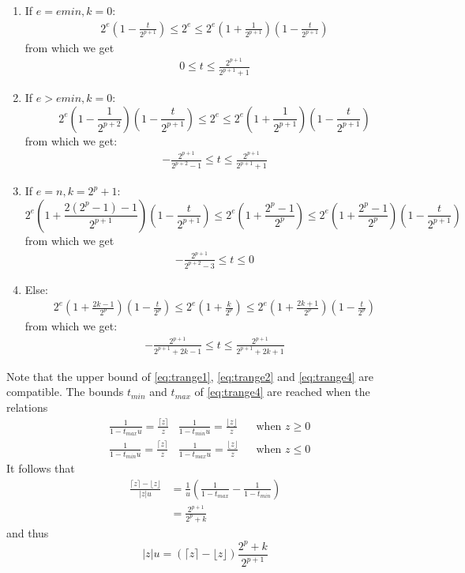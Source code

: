 \documentclass[10pt,a4paper]{article}
\theoremstyle{plain}
\theoremstyle{definition}
\newcommand{\ceil}[1]{\lceil #1 \rceil}
\newcommand{\floor}[1]{\lfloor #1 \rfloor}
\newcommand{\absv}[1]{\vert #1\vert}
\begin{document}
\begin{enumerate}
\item If $e=emin, k=0$:
\begin{align*}
2^e\left(1-\frac{t}{2^{p+1}}\right)\leq 2^e\leq 2^e\left(1+\frac{1}{2^{p+1}}\right)\left(1-\frac{t}{2^{p+1}}\right)
\end{align*}
from which we get
\begin{align}
0\leq t\leq\frac{2^{p+1}}{2^{p+1}+1}\label{eq:trange1}
\end{align}
\item If $e>emin, k=0$:
\[
2^e\left(1-\frac{1}{2^{p+2}}\right)\left(1-\frac{t}{2^{p+1}}\right)\leq 2^e\leq 2^e\left(1+\frac{1}{2^{p+1}}\right)\left(1-\frac{t}{2^{p+1}}\right)
\]
from which we get:
\begin{align}
-\frac{2^{p+1}}{2^{p+2}-1}\leq t\leq \frac{2^{p+1}}{2^{p+1}+1}\label{eq:trange2}
\end{align}
\item If $e=n, k=2^p+1$:
\[
2^e\left(1+\frac{2(2^p-1)-1}{2^{p+1}}\right)\left(1-\frac{t}{2^{p+1}}\right)\leq 2^e\left(1+\frac{2^p-1}{2^p}\right) \leq 2^e\left(1+\frac{2^p-1}{2^p}\right)\left(1-\frac{t}{2^{p+1}}\right)
\]
from which we get
\begin{align}
-\frac{2^{p+1}}{2^{p+2}-3}\leq t\leq 0\label{eq:trange3}
\end{align}

\item Else: 
\begin{align*}
2^e\left(1+\frac{2k-1}{2^p}\right)\left(1-\frac{t}{2^p}\right)\leq 2^e\left(1+\frac{k}{2^p}\right)\leq 2^e\left(1+\frac{2k+1}{2^p}\right)\left(1-\frac{t}{2^p}\right)
\end{align*}
from which we get:
\begin{align}
-\frac{2^{p+1}}{2^{p+1}+2k-1}\leq t\leq \frac{2^{p+1}}{2^{p+1}+2k+1}\label{eq:trange4}
\end{align}
\end{enumerate}


Note that the upper bound of \eqref{eq:trange1}, \eqref{eq:trange2} and \eqref{eq:trange4} are compatible.
The bounds $t_{min}$ and $t_{max}$ of \eqref{eq:trange4} are reached when the relations
\begin{align*}
&\frac{1}{1-t_{max}u}=\frac{\ceil{z}}{z} & \frac{1}{1-t_{min}u}=\frac{\floor{z}}{z} & &\text{when } z\geq 0\\
&\frac{1}{1-t_{min}u}=\frac{\ceil{z}}{z} & \frac{1}{1-t_{max}u}=\frac{\floor{z}}{z} & &\text{when } z\leq 0
\end{align*}
It follows that 
\begin{align*}
\frac{\ceil{z}-\floor{z}}{\absv{z}u}&=\frac{1}{u}\left(\frac{1}{1-t_{max}}-\frac{1}{1-t_{min}}\right)\\
&=\frac{2^{p+1}}{2^p+k}
\end{align*}
and thus
\[
\absv{z}u=(\ceil{z}-\floor{z})\frac{2^p+k}{2^{p+1}}
\]
\end{document}
